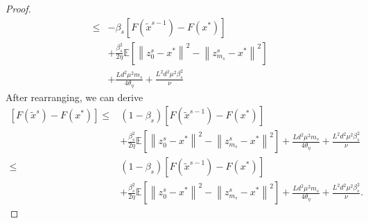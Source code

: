 \documentclass{article}
\newcommand*{\E}{\mathbb{E}}
\newcommand{\norm}[1]{\left\lVert#1\right\rVert}
\theoremstyle{definition}
\theoremstyle{remark}
\begin{document}
\begin{proof}
\begin{equation}
\begin{split}
\leq &-\beta_s[F(\widetilde{x}^{s-1})-F(x^*)] \\
&+ {\frac{ \beta_s^2}{2\eta}}\E[\norm{z_{0}^s-x^*}^2-\norm{z_{m_s}^s-x^*}^2]\\
& +\frac{Ld^2\mu^2m_s}{4\theta_{\eta}}+\frac{L^2d^2\mu^2\beta_s^2}{\nu}
\end{split}
\end{equation}
After rearranging, we can derive
\begin{equation}
\begin{split}
[F(\widetilde{x}^{s})-F(x^*)] \leq &(1-\beta_s)[F(\widetilde{x}^{s-1})-F(x^*)] \\
&+ {\frac{ \beta_s^2}{2\eta}}\E[\norm{z_{0}^s-x^*}^2-\norm{z_{m_s}^s-x^*}^2] +\frac{Ld^2\mu^2m_s}{4\theta_{\eta}}+\frac{L^2d^2\mu^2\beta_s^2}{\nu}\\
\leq &(1-\beta_s)[F(\widetilde{x}^{s-1})-F(x^*)] \\
&+ {\frac{ \beta_s^2}{2\eta}}\E[\norm{z_{0}^s-x^*}^2-\norm{z_{m_s}^s-x^*}^2]+\frac{Ld^2\mu^2m_s}{4\theta_{\eta}}+\frac{L^2d^2\mu^2\beta_s^2}{\nu}.
\end{split}
\end{equation}
\end{proof}
%
%
\end{document}
